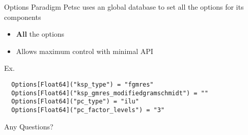 \documentclass{beamer}
\begin{document}
\begin{frame}[fragile]{Options Paradigm}
Petsc uses an global database to set all the options for its components
\begin{itemize}
  \item \textbf{All} the options
  \item Allows maximum control with minimal API
\end{itemize}
\hfill

Ex.
\begin{verbatim}
  Options[Float64]("ksp_type") = "fgmres"
  Options[Float64]("ksp_gmres_modifiedgramschmidt") = ""
  Options[Float64]("pc_type") = "ilu"
  Options[Float64]("pc_factor_levels") = "3"
\end{verbatim}

\end{frame}

\begin{frame}
\begin{center}  
Any Questions?
\end{center}

\end{frame}
\end{document}
